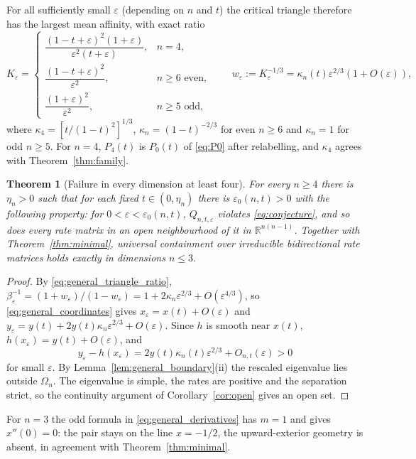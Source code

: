 \documentclass[11pt,a4paper]{article}
\numberwithin{equation}{section}
\newtheorem{theorem}{Theorem}[section]
\theoremstyle{definition}
\theoremstyle{remark}
\newcommand{\Om}{\Omega}
\newcommand{\eps}{\varepsilon}
\begin{document}
For all sufficiently small \(\eps\) (depending on \(n\) and \(t\)) the
critical triangle therefore has the largest mean affinity, with exact
ratio
\begin{equation}
K_\eps=
\begin{cases}
\dfrac{(1-t+\eps)^2(1+\eps)}{\eps^2(t+\eps)},&n=4,\\[0.7em]
\dfrac{(1-t+\eps)^2}{\eps^2},&n\geq6\text{ even},\\[0.7em]
\dfrac{(1+\eps)^2}{\eps^2},&n\geq5\text{ odd},
\end{cases}
\qquad
w_\eps:=K_\eps^{-1/3}=\kappa_n(t)\eps^{2/3}(1+O(\eps)),
\label{eq:general_triangle_ratio}
\end{equation}
where \(\kappa_4=[t/(1-t)^2]^{1/3}\), \(\kappa_n=(1-t)^{-2/3}\) for even
\(n\ge6\) and \(\kappa_n=1\) for odd \(n\ge5\). For \(n=4\),
\(P_4(t)\) is \(P_0(t)\) of \eqref{eq:P0} after relabelling, and
\(\kappa_4\) agrees with Theorem~\ref{thm:family}.

\begin{theorem}[Failure in every dimension at least four]
\label{thm:all_dimensions}
For every \(n\geq4\) there is \(\eta_n>0\) such that for each fixed
\(t\in(0,\eta_n)\) there is \(\eps_0(n,t)>0\) with the following
property: for \(0<\eps<\eps_0(n,t)\), \(Q_{n,t,\eps}\) violates
\eqref{eq:conjecture}, and so does every rate matrix in an open
neighbourhood of it in \(\mathbb R^{n(n-1)}\). Together with
Theorem~\ref{thm:minimal}, universal containment over irreducible
bidirectional rate matrices holds exactly in dimensions \(n\le3\).
\end{theorem}

\begin{proof}
By \eqref{eq:general_triangle_ratio},
\(\beta_\eps^{-1}=(1+w_\eps)/(1-w_\eps)=1+2\kappa_n\eps^{2/3}+O(\eps^{4/3})\),
so \eqref{eq:general_coordinates} gives \(x_\eps=x(t)+O(\eps)\) and
\(y_\eps=y(t)+2y(t)\kappa_n\eps^{2/3}+O(\eps)\). Since \(h\) is smooth
near \(x(t)\), \(h(x_\eps)=y(t)+O(\eps)\), and
\begin{equation}
y_\eps-h(x_\eps)=2y(t)\kappa_n(t)\eps^{2/3}+O_{n,t}(\eps)>0
\label{eq:all_dimensional_gap}
\end{equation}
for small \(\eps\). By Lemma~\ref{lem:general_boundary}(ii) the rescaled
eigenvalue lies outside \(\Om_n\). The eigenvalue is simple, the rates
are positive and the separation strict, so the continuity argument of
Corollary~\ref{cor:open} gives an open set.
\end{proof}

For \(n=3\) the odd formula in \eqref{eq:general_derivatives} has
\(m=1\) and gives \(x''(0)=0\): the pair stays on the line
\(x=-1/2\), the upward-exterior geometry is absent, in agreement with
Theorem~\ref{thm:minimal}.
\end{document}
